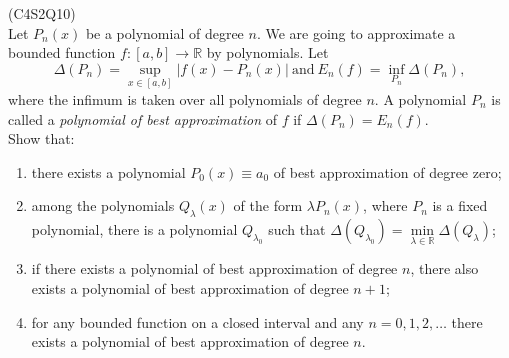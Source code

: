 \begin{prb}
    (C4S2Q10) \\
    Let $P_n(x)$ be a polynomial of degree $n$. We are going to approximate a bounded function $f : [a, b] \to \mathbb{R}$ by polynomials. Let $$\Delta(P_n) = \sup_{x \in [a, b]} |f(x) - P_n(x)| \ \text{and}\ E_n(f) 
    = \inf_{P_n} \Delta(P_n),$$ where the infimum is taken over all polynomials of degree $n$. A polynomial $P_n$ is called a \textit{polynomial of best approximation} of $f$ if $\Delta(P_n) = E_n(f)$. \\
    Show that: 
    \begin{enumerate}
        \item[a)] there exists a polynomial $P_0(x) \equiv a_0$ of best approximation of degree zero;
        \item[b)] among the polynomials $Q_\lambda(x)$ of the form $\lambda P_n(x)$, where $P_n$ is a fixed polynomial, there is a polynomial $Q_{\lambda_0}$ such that $\Delta(Q_{\lambda_0}) = 
        \min\limits_{\lambda \in \mathbb{R}} \Delta(Q_\lambda)$;
        \item[c)] if there exists a polynomial of best approximation of degree $n$, there
        also exists a polynomial of best approximation of degree $n + 1$;
        \item[d)] for any bounded function on a closed interval and any $n = 0, 1, 2, \ldots$ there exists a polynomial of best approximation of degree $n$.
    \end{enumerate}
\end{prb}
